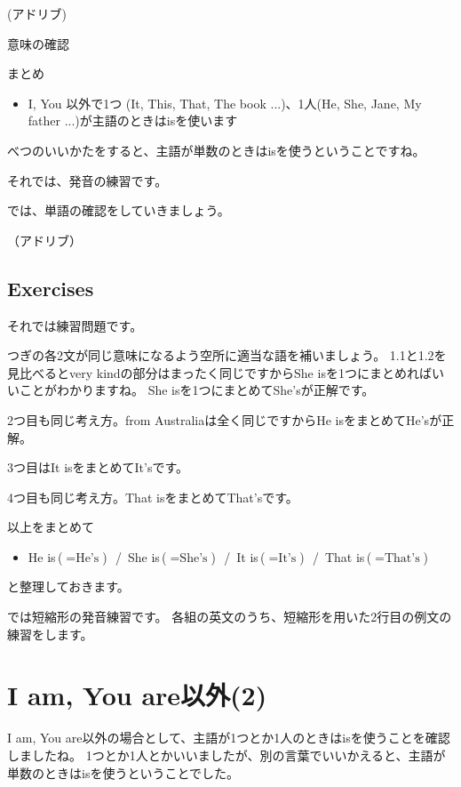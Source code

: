 \documentclass[book,jafontscale=0.9247]{jlreq}
\begin{document}
(アドリブ)

意味の確認

まとめ

\begin{itemize}
 \item I, You 以外で1つ (It, This, That, The book ...)、1人(He, She, Jane, My father ...)が主語のときはisを使います
\end{itemize}

べつのいいかたをすると、主語が単数のときはisを使うということですね。

それでは、発音の練習です。

では、単語の確認をしていきましょう。

（アドリブ）

\subsection{Exercises}

それでは練習問題です。

つぎの各2文が同じ意味になるよう空所に適当な語を補いましょう。
1.1と1.2を見比べるとvery kindの部分はまったく同じですからShe isを1つにまとめればいいことがわかりますね。
She isを1つにまとめてShe'sが正解です。

2つ目も同じ考え方。from Australiaは全く同じですからHe isをまとめてHe'sが正解。

3つ目はIt isをまとめてIt'sです。

4つ目も同じ考え方。That isをまとめてThat'sです。

以上をまとめて
\begin{itemize}
 \item He is\,($=\text{He's}$)\,\,\,\,/\,\,\,She is\,($=\text{She's}$)\,\,\,\,/\,\,\,It is\,($=\text{It's}$)\,\,\,\,/\,\,\,That is\,($=\text{That's}$)
\end{itemize} 
と整理しておきます。

では短縮形の発音練習です。
各組の英文のうち、短縮形を用いた2行目の例文の練習をします。
\newpage

\section{I am, You are以外(2)}
{\large \ComputerMouse}

I am, You are以外の場合として、主語が1つとか1人のときはisを使うことを確認しましたね。
1つとか1人とかいいましたが、別の言葉でいいかえると、主語が単数のときはisを使うということでした。
\end{document}
